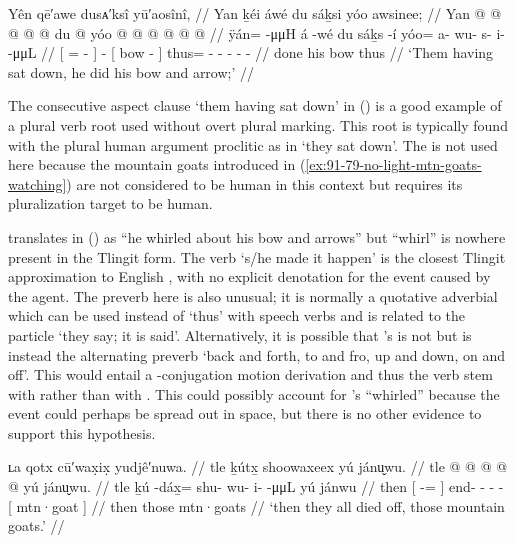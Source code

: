 \ex\label{ex:91-80-they-sat-did-bow}%
%
\begingl
	\glpreamble	Yên qē′awe dusᴀ′ksî yū′aosînî, //
	\glpreamble	Yan ḵéi áwé du sáḵsi yóo awsinee; //
	\gla	{} Yan @  @ {} @ {} @ {} {}  @ {}
		{} du  @ {} {}
		yóo @  @ {} @ {} @ {} @ {} @ {} //
	\glb	{} ÿán= {}  -μμH {} {} á -wé
		{} du sáḵs -í {}
		yóo= a- wu- s- i-  -μμL //
	\glc	{}[ = \·  - \· {}]  -
		{}[  bow - {}]
		thus= - - - -  - //
	\gld	{} done\•  {} {} {} {}  {}
		{} his bow {} {}
		thus  {} {} {} {} {} //
	\glft	‘Them having sat down, he did his bow and arrow;’
		//
\endgl
\xe

The consecutive aspect clause  ‘them having sat down’ in (\lastx) is a good example of a plural verb root used without overt plural marking.
This root is typically found with the plural human argument proclitic  as in  ‘they sat down’.
The  is not used here because the mountain goats introduced in (\ref{ex:91-79-no-light-mtn-goats-watching}) are not considered to be human in this context but  requires its pluralization target to be human.

\citeauthor{swanton:1909} translates  in (\lastx) as “he whirled about his bow and arrows” but “whirl” is nowhere present in the Tlingit form.
The verb  ‘s/he made it happen’ is the closest Tlingit approximation to English , with no explicit denotation for the event caused by the agent.
The preverb  here is also unusual; it is normally a quotative adverbial which can be used instead of  ‘thus’ with speech verbs and is related to the particle  ‘they say; it is said’.
Alternatively, it is possible that \citeauthor{swanton:1909}’s  is not  but is instead the alternating preverb  ‘back and forth, to and fro, up and down, on and off’.
This  would entail a -conjugation motion derivation and thus the verb stem  with  rather than  with .
This could possibly account for \citeauthor{swanton:1909}’s “whirled” because the event could perhaps be spread out in space, but there is no other evidence to support this hypothesis.

\ex\label{ex:91-81-mtn-goats-died-off}%
%
\begingl
	\glpreamble	ʟa qotx cū′wax̣ix̣ yudjê′nuwa. //
	\glpreamble	tle ḵútx̱ shoowaxeex yú jánu̬wu. //
	\gla	tle {}  @ {} {}  @ {} @ {} @ {} @ {}
		{} yú jánu̬wu. {} //
	\glb	tle {} ḵú -dáx̱= {} shu- wu- i-  -μμL
		{} yú jánwu {} //
	\glc	then {}[  -= {}] end- - -  -
		{}[  mtn·goat {}] //
	\gld	then {}  {} {}  {} {} {} {} 
		{} those mtn·goats {} //
	\glft	‘then they all died off, those mountain goats.’
		//
\endgl
\xe

